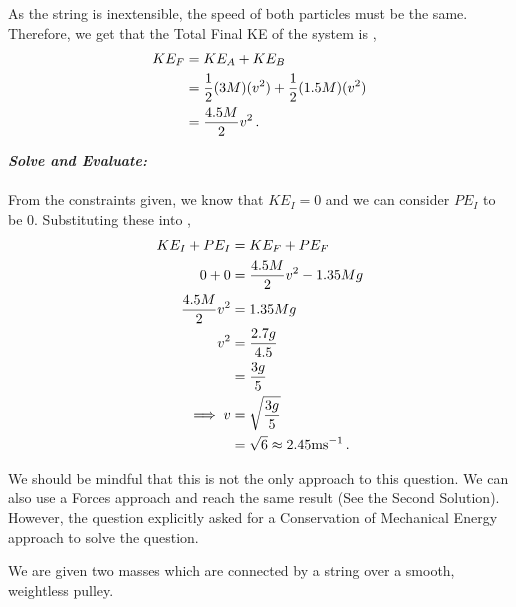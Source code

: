 \begin{subquestions}
As the string is inextensible, the speed of both particles must be the same. Therefore, we get that the Total Final KE of the system is ,
\begin{align}
	KE_F & = KE_A + KE_B \nonumber \\
	     & = \frac{1}{2}(3M)(v^2) + \frac{1}{2}(1.5M)(v^2) \nonumber \\
	     & = \frac{4.5M}{2}v^2 \,.
\end{align}




\textbf{\textit{Solve and Evaluate:}} \\ \\ 
From the constraints given, we know that $KE_I=0$ and we can consider $PE_I$ to be 0. Substituting these into , 
\begin{align}
	KE_I + PE_I & = KE_F + PE_F \nonumber \\
	0 + 0 & = \frac{4.5M}{2}v^2 - 1.35Mg \nonumber \\
	\frac{4.5M}{2}v^2 & = 1.35Mg \nonumber \\
	v^2 & = \frac{2.7g}{4.5} \nonumber \\
	    & = \frac{3g}{5} \nonumber \\
	    \implies v & = \sqrt{\frac{3g}{5}} \nonumber \\
	               & = \sqrt{6} \approx 2.45 \text{ms}^{-1} \,.
\end{align}

We should be mindful that this is not the only approach to this question. We can also use a Forces approach and reach the same result (See the Second Solution). However, the question explicitly asked for a Conservation of Mechanical Energy approach to solve the question.
	

\subquestion
We are given two masses which are connected by a string over a smooth, weightless pulley.


\end{subquestions}
